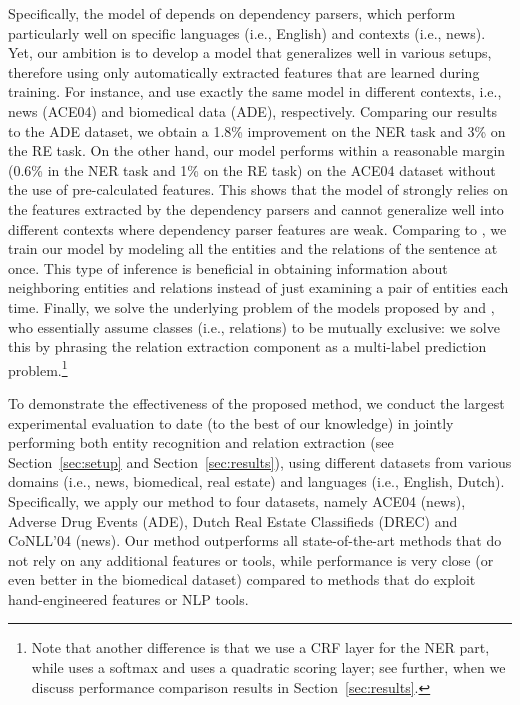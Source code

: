 \documentclass[review]{elsarticle}
\newcommand{\ie}{i.e., }
\newcommand{\secref}[1]{Section~\ref{#1}}
\begin{document}
Specifically, the model of \cite{miwa:16} depends on dependency parsers, which perform particularly well on specific languages (\ie English) and contexts (\ie news).
Yet, our ambition is to develop a model that generalizes well in various setups, therefore using only automatically extracted features that are learned during training. For instance, \cite{miwa:16} and \cite{li:17} use exactly the same model in different contexts, \ie news (ACE04) and biomedical data (ADE), respectively. Comparing our results to the ADE dataset, we obtain a 1.8\% improvement on the NER task and 3\% on the RE task. On the other hand, our model performs within a reasonable margin (0.6\% in the NER task and 1\% on the RE task) on the ACE04 dataset without the use of pre-calculated features. This shows that the model of \cite{miwa:16} strongly relies on the features extracted by the dependency parsers and cannot generalize well into different contexts where dependency parser features are weak. Comparing to \cite{heike:17}, we train our model by modeling all the entities and the relations of the sentence at once. This type of inference is beneficial in obtaining information about neighboring entities and relations instead of just examining a pair of entities each time.
Finally, we solve the underlying problem of the models proposed by \cite{katiyar:17} and \cite{bekoulis:17}, who essentially assume classes (\ie relations) to be mutually exclusive: we solve this by phrasing the relation extraction component as a multi-label prediction problem.\footnote{Note that another difference is that we use a CRF layer for the NER part, while \cite{katiyar:17} uses a softmax and \cite{bekoulis:17} uses a quadratic scoring layer; see further, when we discuss performance comparison results in \secref{sec:results}.}

To demonstrate the effectiveness of the proposed method, we conduct the largest experimental evaluation to date (to the best of our knowledge) in jointly performing both entity recognition and relation extraction (see \secref{sec:setup} and \secref{sec:results}), using different datasets from various domains (\ie news, biomedical, real estate) and languages (\ie English, Dutch). Specifically, we apply our method to four datasets, namely ACE04 (news), Adverse Drug Events (ADE), Dutch Real Estate Classifieds (DREC) and CoNLL'04 (news). Our method outperforms all state-of-the-art methods that do not rely on any additional features or tools, while performance is very close (or even better in the biomedical dataset) compared to methods that do exploit hand-engineered features or NLP tools.
\end{document}
